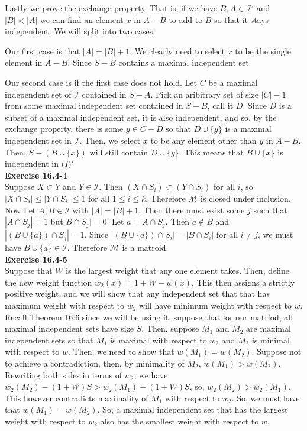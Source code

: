 \documentclass{article}
\begin{document}
Lastly we prove the exchange property. That is, if we have $B,A \in \mathcal{I}'$ and $|B|<|A|$ we can find an element $x$ in $A-B$ to add to $B$ so that it stays independent. We will split into two cases. 

Our first case is that $|A| = |B|+1$. We clearly need to select $x$ to be the single element in $A-B$. Since $S-B$ contains a maximal independent set

Our second case is if the first case does not hold. Let $C$ be a maximal independent set of $\mathcal{I}$ contained in $S-A$. Pick an aribitrary set of size $|C|-1$ from some maximal independent set contained in $S-B$, call it $D$. Since $D$ is a subset of a maximal independent set, it is also independent, and so, by the exchange property, there is some $y\in C-D$ so that $D\cup\{y\}$ is a maximal independent set in $\mathcal{I}$. Then, we select $x$ to be any element other than $y$ in $A-B$. Then, $S - (B\cup\{x\})$ will still contain $D\cup\{y\}$. This means that $B\cup \{x\}$ is independent in $\mathcal(I)'$\\

\noindent\textbf{Exercise 16.4-4}\\

Suppose $X \subset Y$ and $Y \in \mathcal{I}$.  Then $(X \cap S_i) \subset (Y \cap S_i)$ for all $i$, so $|X \cap S_i| \leq |Y \cap S_i| \leq 1$ for all $1 \leq i \leq k$. Therefore $\mathcal{M}$ is closed under inclusion.\\ 

Now Let $A, B \in \mathcal{I}$ with $|A| = |B| + 1$.  Then there must exist some $j$ such that $|A \cap S_j| = 1$ but $B \cap S_j| = 0$.  Let $a = A \cap S_j$.  Then $a \notin B$ and $|(B \cup \{a\}) \cap S_j| = 1$.  Since $|(B \cup \{a\}) \cap S_i| = |B \cap S_i|$ for all $i \neq j$, we must have $B \cup \{a\} \in \mathcal{I}$.  Therefore $\mathcal{M}$ is a matroid.\\

\noindent\textbf{Exercise 16.4-5}\\

Suppose that $W$ is the largest weight that any one element takes. Then, define the new weight function $w_2(x) = 1+ W - w(x)$. This then assigns a strictly positive weight, and we will show that any independent set that that has maximum weight with respect to $w_2$ will have minimum weight with respect to $w$. Recall Theorem 16.6 since we will be using it, suppose that for our matriod, all maximal independent sets have size $S$. Then, suppose $M_1$ and $M_2$ are maximal independent sets so that $M_1$ is maximal with respect to $w_2$ and $M_2$ is minimal with respect to $w$. Then, we need to show that $w(M_1) = w(M_2)$. Suppose not to achieve a contradiction, then, by minimality of $M_2$, $w(M_1) > w (M_2)$. Rewriting both sides in terms of $w_2$, we have $w_2(M_2) - (1+W)S > w_2(M_1) - (1+W)S$, so, $w_2(M_2) > w_2(M_1)$. This however contradicts maximality of $M_1$ with respect to $w_2$. So, we must have that $w(M_1) = w(M_2)$. So, a maximal independent set that has the largest weight with respect to $w_2$ also has the smallest weight with respect to $w$.
\end{document}
